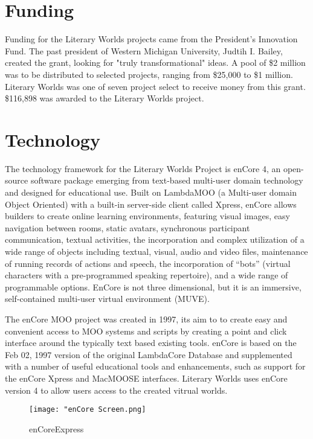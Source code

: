 \documentclass[12pt, letterpaper]{report}
\begin{document}
	\section{Funding}
	\par
	Funding for the Literary Worlds projects came from the President's Innovation Fund.  The past president of Western Michigan University, Judtih I. Bailey, created the grant, looking for "truly transformational" ideas. A pool of \$2 million was to be distributed to selected projects, ranging from \$25,000 to \$1 million. Literary Worlds was one of seven project select to receive money from this grant. \$116,898 was awarded to the Literary Worlds project.
	
		\section{Technology}
		\par
		The technology framework for the Literary Worlds Project is enCore 4, an open-source software package emerging from text-based multi-user domain technology and designed for educational use.   Built on LambdaMOO (a Multi-user domain Object Oriented) with a built-in server-side client called Xpress, enCore allows builders to create online learning environments, featuring visual images, easy navigation between rooms, static avatars, synchronous participant communication, textual activities, the incorporation and complex utilization of a wide range of objects including textual, visual, audio and video files, maintenance of running records of actions and speech, the incorporation of “bots” (virtual characters with a pre-programmed speaking repertoire), and a wide range of programmable options.  EnCore is not three dimensional, but it is an immersive, self-contained multi-user virtual environment (MUVE).
	
	\par 
	The enCore MOO project was created in 1997, its aim to to create easy and convenient access to MOO systems and scripts by creating a point and click interface around the typically text based existing tools. enCore is based on the Feb 02, 1997 version of the original LambdaCore Database and supplemented with a number of useful educational tools and enhancements, such as support for the enCore Xpress and MacMOOSE interfaces. Literary Worlds uses enCore version 4 to allow users access to the created vitrual worlds.
	
\begin{figure}[htp]
\centering
\texttt{[image: "enCore Screen.png]}
\caption{enCoreExpress}
\end{figure}
\end{document}
